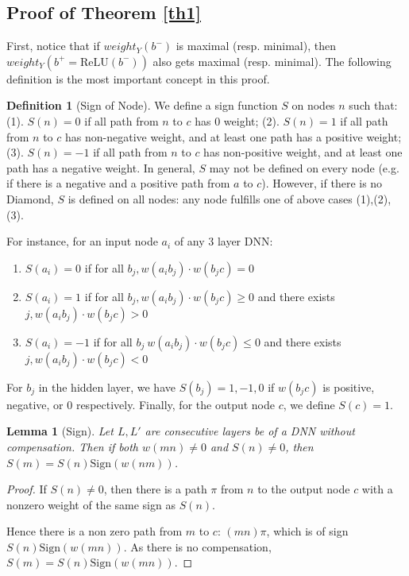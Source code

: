 \documentclass[]{article}
\newtheorem{lemma}{Lemma}
\theoremstyle{definition}
\newtheorem{definition}{Definition}
\newcommand{\ReLU}{\mathrm{ReLU}}
\begin{document}
\subsection*{Proof of Theorem \ref{th1}}

First, notice that if $weight_Y(b^-)$ is maximal (resp. minimal), 
then $weight_Y(b^+=\ReLU(b^-))$ also gets maximal (resp. minimal).
The following definition is the most important concept in this proof.

\begin{definition}[Sign of Node]\label{sign_of_nodes}
	We define a sign function $S$ on nodes $n$ such that: 	(1). $S(n)=0$ if all path from $n$ to $c$ has 0 weight; (2). $S(n)=1$ if all path from $n$ to $c$ has non-negative weight, and at least one path has a positive weight; (3). $S(n)=-1$ if all path from $n$ to $c$ has non-positive weight, and at least one path has a negative weight. 
	In general, $S$ may not be defined on every node (e.g. if there is a negative and a positive path from $a$ to $c$). However, if there is no Diamond, $S$ is defined on all nodes: any node fulfills one of above cases (1),(2),(3).


	For instance, for an input node $a_i$ of any 3 layer DNN:
	\begin{enumerate}
      \item  $S(a_i)=0$ if 
	  for all $b_j, w(a_i b_j)\cdot w(b_j c) = 0$
	
	
	 \item  $S(a_i)=1$ if for all $b_j, w(a_i b_j)\cdot w(b_j c) \geq 0$ and there exists 
	 $j, w(a_i b_j)\cdot w(b_j c) > 0$
	
	\item $S(a_i)=-1$ if for all $b_j\ w(a_i b_j)\cdot w(b_j c) \leq 0$ and there exists 
	$j, w(a_i b_j)\cdot w(b_j c) < 0$ 
\end{enumerate}

For $b_j$ in the hidden layer, we have $S(b_j)=1,-1,0$ if $w(b_j c)$ is positive, negative, or 0 respectively. Finally, for the output node $c$, we define $S(c)=1$.
\end{definition}


\begin{lemma}[Sign]
	\label{lemma1}
Let $L,L'$  are consecutive layers be of a DNN without compensation. 
Then if both 
$w(m n) \neq 0$ and $S(n) \neq 0$, then 
	$S(m)=S(n)\mathrm{Sign}(w(n m))$.
\end{lemma}

\begin{proof}
	If $S(n) \neq 0$, then there is a path $\pi$ from $n$ to the output node $c$ with a nonzero weight of the same sign as $S(n)$. 
	
	Hence there is a non zero path from $m$ to $c$: $(m n) \pi$, which is of sign 
	$S(n)\mathrm{Sign}(w(mn))$. As there is no compensation, $S(m)=S(n)\mathrm{Sign}(w(mn))$.
\end{proof}
\end{document}
